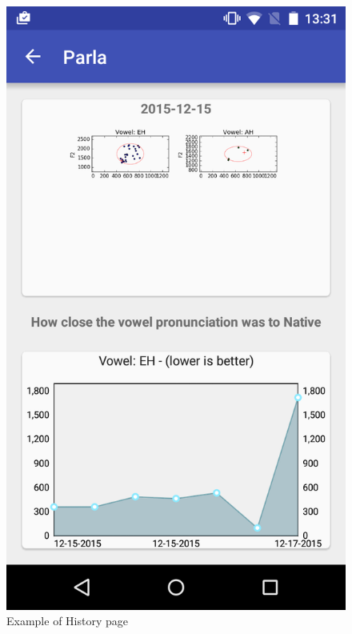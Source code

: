 \begin{figure}[!ht]
	\centering
	\begin{minipage}{.5\textwidth}
		\centering
		\includegraphics[scale=0.18]{Figures/screenshots/history2.png}
		\caption{Example of History page}
		\label{fig:history2_page}
	\end{minipage}%
	\begin{minipage}{.5\textwidth}
		\centering

\end{minipage}
\end{figure}

